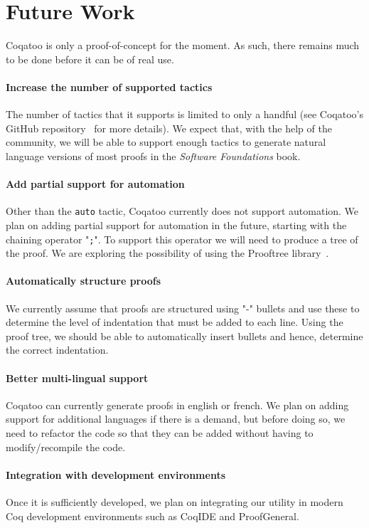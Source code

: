 \documentclass[sigplan,9pt]{acmart}\settopmatter{printfolios=true,printccs=false,printacmref=false}
\begin{document}
\pagebreak
\section{Future Work}
Coqatoo is only a proof-of-concept for the moment. As such, there remains much to be done before it can be of real use. 

\paragraph{Increase the number of supported tactics}
The number of tactics that it supports is limited to only a handful (see Coqatoo's GitHub repository~\cite{Coqatoo} for more details). We expect that, with the help of the community, we will be able to support enough tactics to generate natural language versions of most proofs in the \emph{Software Foundations} book.

\paragraph{Add partial support for automation}
Other than the \lstinline{auto} tactic, Coqatoo currently does not support automation. We plan on adding partial support for automation in the future, starting with the chaining operator "\lstinline{;}". To support this operator we will need to produce a tree of the proof. We are exploring the possibility of using the Prooftree library~\cite{Prooftree}.


\paragraph{Automatically structure proofs}
We currently assume that proofs are structured using "-" bullets and use these to determine the level of indentation that must be added to each line. Using the proof tree, we should be able to automatically insert bullets and hence, determine the correct indentation.

\paragraph{Better multi-lingual support}
Coqatoo can currently generate proofs in english or french. We plan on adding support for additional languages if there is a demand, but before doing so, we need to refactor the code so that they can be added without having to modify/recompile the code.

\paragraph{Integration with development environments} Once it is sufficiently developed, we plan on integrating our utility in modern Coq development environments such as CoqIDE and ProofGeneral.
\end{document}
